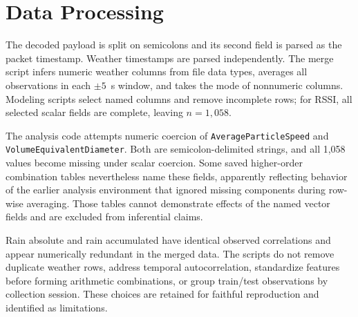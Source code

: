 \section{Data Processing}
The decoded payload is split on semicolons and its second field is parsed as the packet timestamp. Weather timestamps are parsed independently. The merge script infers numeric weather columns from file data types, averages all observations in each $\pm5$~s window, and takes the mode of nonnumeric columns. Modeling scripts select named columns and remove incomplete rows; for RSSI, all selected scalar fields are complete, leaving $n=1{,}058$.

The analysis code attempts numeric coercion of \texttt{AverageParticleSpeed} and \texttt{VolumeEquivalentDiameter}. Both are semicolon-delimited strings, and all 1,058 values become missing under scalar coercion. Some saved higher-order combination tables nevertheless name these fields, apparently reflecting behavior of the earlier analysis environment that ignored missing components during row-wise averaging. Those tables cannot demonstrate effects of the named vector fields and are excluded from inferential claims.

Rain absolute and rain accumulated have identical observed correlations and appear numerically redundant in the merged data. The scripts do not remove duplicate weather rows, address temporal autocorrelation, standardize features before forming arithmetic combinations, or group train/test observations by collection session. These choices are retained for faithful reproduction and identified as limitations.
